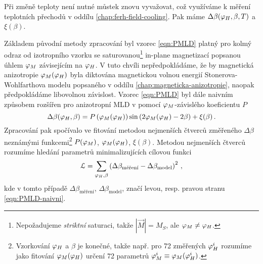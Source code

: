 Při změně teploty není nutné můstek znovu vyvažovat, což využíváme k měření teplotních přechodů v oddílu \ref{chap:ferh-field-cooling}.
Pak máme $\Delta\beta(\varphi_H, \beta, T)$ a $\xi(\beta)$.

Základem původní metody zpracování byl vzorec \eqref{eqn:PMLD} platný pro kolmý odraz od izotropního vzorku se saturovanou\footnote{Nepožadujeme \emph{striktní} saturaci, takže $|\vec{M}|=M_S$, ale $\varphi_M\neq\varphi_H$.} in-plane magnetizací popsanou úhlem $\varphi_M$ závisejícím na $\varphi_H$.
V tuto chvíli nepředpokládáme, že by magnetická anizotropie $\varphi_M(\varphi_H)$ byla diktována magnetickou volnou energií Stonerova-Wohlfarthova modelu popsaného v oddílu \ref{chap:magneticka-anizotropie}, naopak předpokládáme libovolnou závislost.
Vzorec \eqref{eqn:PMLD} byl dále naivním způsobem rozšířen pro anizotropní MLD v \cite{wohlrathMagnetooptickaCharakterizaceSpintronickych2018} pomocí $\varphi_M$-závislého koeficientu $P$
\begin{equation}
\label{eqn:PMLD-naivni}
    \Delta\beta(\varphi_H, \beta)=P\left(\varphi_M(\varphi_H)\right) \sin\left(2\varphi_M(\varphi_H)-2\beta\right)+\xi(\beta) \,.
\end{equation}
Zpracování pak spočívalo ve fitování metodou nejmenších čtverců změřeného $\Delta\beta$ neznámými funkcemi\footnote{Vzorkování $\varphi_H$ a $\beta$ je konečné, takže např. pro 72 změřených $\varphi_H^i$ rozumíme jako fitování $\varphi_M(\varphi_H)$ určení 72 parametrů $\varphi_M^i\equiv\varphi_M(\varphi_H^i)$.} $P(\varphi_M)$, $\varphi_M(\varphi_H)$, $\xi(\beta)$.
Metodou nejmenších čtverců rozumíme hledání parametrů minimalizujících cílovou funkci
\begin{equation}
\label{eqn:}
    \mathcal{L} = \sum_{\varphi_H, \beta} \left( \Delta\beta_\textrm{měření} - \Delta\beta_\textrm{model} \right)^2\,,
\end{equation}
kde v tomto případě $\Delta\beta_\textrm{měření}$, $\Delta\beta_\textrm{model}$, značí levou, resp. pravou stranu \eqref{eqn:PMLD-naivni}.

